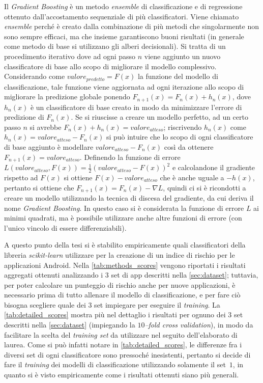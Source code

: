 \documentclass[12pt,a4paper,oneside]{article}
\begin{document}
Il \textit{Gradient Boosting} \cite{BOOSTING} è un metodo \textit{ensemble} di classificazione e di regressione ottenuto dall'accostamento sequenziale di più classificatori. Viene chiamato \textit{ensemble} perché è creato dalla combinazione di più metodi che singolarmente non sono sempre efficaci, ma che insieme garantiscono buoni risultati (in generale come metodo di base si utilizzano gli alberi decisionali). Si tratta di un procedimento iterativo dove ad ogni passo $n$ viene aggiunto un nuovo classificatore di base allo scopo di migliorare il modello complessivo. Considerando come $valore_{predetto} = F(x)$ la funzione del modello di classificazione, tale funzione viene aggiornata ad ogni iterazione allo scopo di migliorare la predizione globale ponendo $F_{n+1}(x) = F_{n}(x) + h_{n}(x)$, dove $h_{n}(x)$ è un classificatore di base creato in modo da minimizzare l'errore di predizione di $F_{n}(x)$. Se si riuscisse a creare un modello perfetto, ad un certo passo $n$ si avrebbe $F_{n}(x) + h_{n}(x) = valore_{atteso}$; riscrivendo $h_{n}(x)$ come $h_{n}(x) = valore_{atteso} - F_{n}(x)$ si può intuire che lo scopo di ogni classificatore di base aggiunto è modellare $valore_{atteso} - F_{n}(x)$ così da ottenere $F_{n+1}(x) = valore_{atteso}$. Definendo la funzione di errore $L(valore_{atteso},F(x)) = \frac{1}{2}(valore_{atteso} - F(x))^2$ e calcolandone il gradiente rispetto ad $F(x)$ si ottiene $F(x) - valore_{atteso}$ che è anche uguale a $-h(x)$, pertanto si ottiene che $F_{n+1}(x) = F_{n}(x) - \nabla L$, quindi ci si è ricondotti a creare un modello utilizzando la tecnica di discesa del gradiente, da cui deriva il nome \textit{Gradient Boosting}. In questo caso si è considerata la funzione di errore $L$ ai minimi quadrati, ma è possibile utilizzare anche altre funzioni di errore (con l'unico vincolo di essere differenziabili).
\newline

A questo punto della tesi si è stabilito empiricamente quali classificatori della libreria \mbox{\textit{scikit-learn}} utilizzare per la creazione di un indice di rischio per le applicazioni Android. Nella \cref{tab:methods_scores} vengono riportati i risultati aggregati ottenuti analizzando i $3$ set di app descritti nella \cref{sec:dataset}; tuttavia, per poter calcolare un punteggio di rischio anche per nuove applicazioni, è necessario prima di tutto allenare il modello di classificazione, e per fare ciò bisogna scegliere quale dei $3$ set impiegare per eseguire il \textit{training}. La \cref{tab:detailed_scores} mostra più nel dettaglio i risultati per ognuno dei $3$ set descritti nella \cref{sec:dataset} (impiegando la \textit{$10$--fold cross validation}), in modo da facilitare la scelta del \textit{training set} da utilizzare nel seguito dell'elaborato di laurea. Come si può infatti notare in \cref{tab:detailed_scores}, le differenze fra i diversi set di ogni classificatore sono pressoché inesistenti, pertanto si decide di fare il \textit{training} dei modelli di classificazione utilizzando solamente il set~$1$, in quanto si è visto empiricamente come i risultati ottenuti siano più generali.
\end{document}
